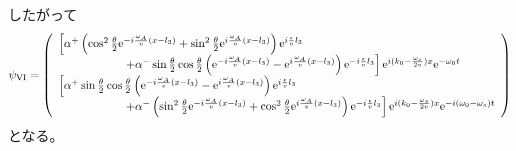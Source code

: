 したがって
\begin{equation}
\psi_\mathrm{VI} =\left( \begin{array}{l} \left[\alpha^+ \left(\cos^2\frac{\theta}{2}\mathrm{e}^{-i\frac{\omega_A}{v}(x-l_3)} +\sin^2\frac{\theta}{2}\mathrm{e}^{i\frac{\omega_A}{v}(x-l_3)} \right)\mathrm{e}^{i\frac{\epsilon}{v}l_3} \right. \\ \hspace{2cm}\left. +\alpha^- \sin\frac{\theta}{2}\cos\frac{\theta}{2} \left(\mathrm{e}^{-i\frac{\omega_A}{v}(x-l_3)}-\mathrm{e}^{i\frac{\omega_A}{v}(x-l_3)}\right)\mathrm{e}^{-i\frac{\epsilon}{v}l_3}\right]\mathrm{e}^{i(k_0-\frac{\omega_s}{2v})x}\mathrm{e}^{-\omega_0t} \\ \left[\alpha^+ \sin\frac{\theta}{2}\cos\frac{\theta}{2} \left(\mathrm{e}^{-i\frac{\omega_A}{v}(x-l_3)}-\mathrm{e}^{i\frac{\omega_A}{v}(x-l_3)}\right)\mathrm{e}^{i\frac{\epsilon}{v}l_3} \right. \\ \hspace{2cm} \left. +\alpha^- \left(\sin^2\frac{\theta}{2}\mathrm{e}^{-i\frac{\omega_A}{v}(x-l_3)} +\cos^2\frac{\theta}{2}\mathrm{e}^{i\frac{\omega_A}{v}(x-l_3)} \right) \mathrm{e}^{-i\frac{\epsilon}{v}l_3}\right] \mathrm{e}^{i(k_0-\frac{\omega_s}{2v})x} \mathrm{e}^{-i(\omega_0-\omega_s) t} \end{array}\right)
\end{equation}
となる。

